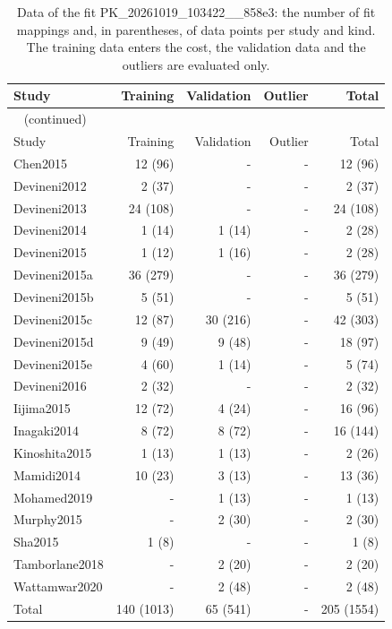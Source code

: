 \documentclass{article}
\begin{document}
\begin{longtable}{lrrrr}
\caption{Data of the fit PK\_20261019\_103422\_\_858e3: the number of fit mappings and, in parentheses, of data points per study and kind. The training data enters the cost, the validation data and the outliers are evaluated only.}\label{tab:data:PK_20261019_103422__858e3} \\
\toprule
Study & Training & Validation & Outlier & Total \\
\midrule
\endfirsthead
\multicolumn{5}{l}{\small\tablename~\thetable{} (continued)} \\
\toprule
Study & Training & Validation & Outlier & Total \\
\midrule
\endhead
\bottomrule
\endlastfoot
Chen2015 & 12 (96) & - & - & 12 (96) \\
Devineni2012 & 2 (37) & - & - & 2 (37) \\
Devineni2013 & 24 (108) & - & - & 24 (108) \\
Devineni2014 & 1 (14) & 1 (14) & - & 2 (28) \\
Devineni2015 & 1 (12) & 1 (16) & - & 2 (28) \\
Devineni2015a & 36 (279) & - & - & 36 (279) \\
Devineni2015b & 5 (51) & - & - & 5 (51) \\
Devineni2015c & 12 (87) & 30 (216) & - & 42 (303) \\
Devineni2015d & 9 (49) & 9 (48) & - & 18 (97) \\
Devineni2015e & 4 (60) & 1 (14) & - & 5 (74) \\
Devineni2016 & 2 (32) & - & - & 2 (32) \\
Iijima2015 & 12 (72) & 4 (24) & - & 16 (96) \\
Inagaki2014 & 8 (72) & 8 (72) & - & 16 (144) \\
Kinoshita2015 & 1 (13) & 1 (13) & - & 2 (26) \\
Mamidi2014 & 10 (23) & 3 (13) & - & 13 (36) \\
Mohamed2019 & - & 1 (13) & - & 1 (13) \\
Murphy2015 & - & 2 (30) & - & 2 (30) \\
Sha2015 & 1 (8) & - & - & 1 (8) \\
Tamborlane2018 & - & 2 (20) & - & 2 (20) \\
Wattamwar2020 & - & 2 (48) & - & 2 (48) \\
Total & 140 (1013) & 65 (541) & - & 205 (1554) \\
\end{longtable}
\end{document}
